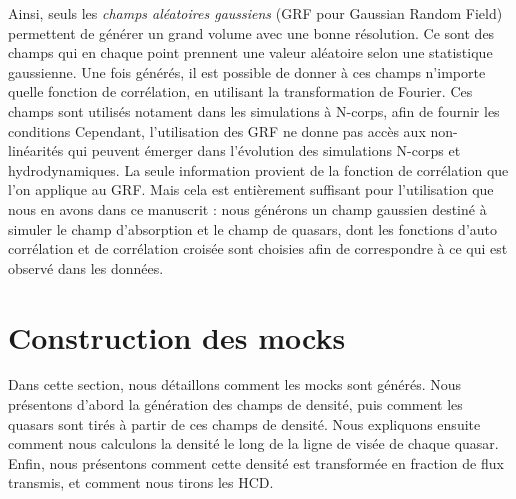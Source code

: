 Ainsi, seuls les \emph{champs aléatoires gaussiens} (GRF pour Gaussian Random Field) permettent de générer un grand volume avec une bonne résolution.
Ce sont des champs qui en chaque point prennent une valeur aléatoire selon une statistique gaussienne.
Une fois générés, il est possible de donner à ces champs n'importe quelle fonction de corrélation, en utilisant la transformation de Fourier.
Ces champs sont utilisés notament dans les simulations à N-corps, afin de fournir les conditions 
Cependant, l'utilisation des GRF ne donne pas accès aux non-linéarités qui peuvent émerger dans l'évolution des simulations N-corps et hydrodynamiques. La seule information provient de la fonction de corrélation que l'on applique au GRF.
Mais cela est entièrement suffisant pour l'utilisation que nous en avons dans ce manuscrit : nous générons un champ gaussien destiné à simuler le champ d'absorption \lya{} et le champ de quasars, dont les fonctions d'auto corrélation et de corrélation croisée sont choisies afin de correspondre à ce qui est observé dans les données.


\section{Construction des mocks}
Dans cette section, nous détaillons comment les mocks sont générés.
Nous présentons d'abord la génération des champs de densité,
puis comment les quasars sont tirés à partir de ces champs de densité.
Nous expliquons ensuite comment nous calculons la densité le long de la ligne de visée de chaque quasar.
Enfin, nous présentons comment cette densité est transformée en fraction de flux transmis, et comment nous tirons les HCD.


